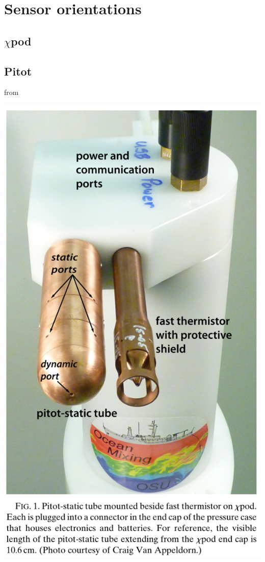 \chapter{Sensor orientations}

\section{$\chi$pod}

\section{Pitot}

from \cite{Moum2015}

{
  \centering
  \includegraphics[height=0.9\textheight]{figs/pitot-exterior-chipod.png}
}

